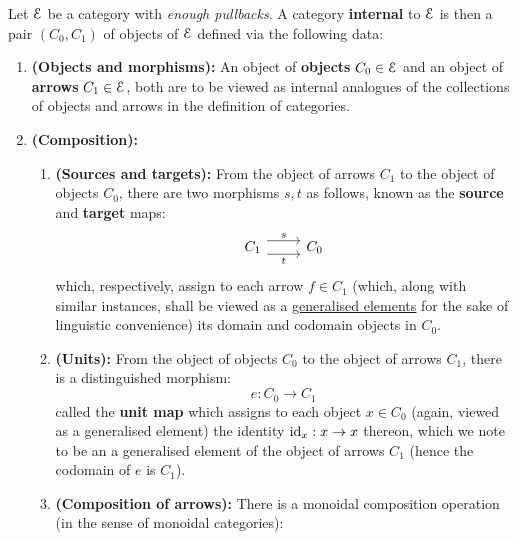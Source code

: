             \begin{definition} \label{def: internal_categories}
                Let $\mathcal{E}$ be a category with \textit{enough pullbacks}. A category \textbf{internal} to $\mathcal{E}$ is then a pair $(C_0, C_1)$ of objects of $\mathcal{E}$ defined via the following data:
                    \begin{enumerate}
                        \item \textbf{(Objects and morphisms):} An object of \textbf{objects} $C_0 \in \mathcal{E}$ and an object of \textbf{arrows} $C_1 \in \mathcal{E}$, both are to be viewed as internal analogues of the collections of objects and arrows in the definition of categories.
                        \item \textbf{(Composition):} 
                            \begin{enumerate}
                                \item \textbf{(Sources and targets):} From the object of arrows $C_1$ to the object of objects $C_0$, there are two morphisms $s, t$ as follows, known as the \textbf{source} and \textbf{target} maps:
                                    $$
                                        \begin{tikzcd}
                                        	{C_1} & {C_0}
                                        	\arrow["s", shift left=2, from=1-1, to=1-2]
                                        	\arrow["t"', shift right=2, from=1-1, to=1-2]
                                        \end{tikzcd}
                                    $$
                                which, respectively, assign to each arrow $f \in C_1$ (which, along with similar instances, shall be viewed as a \href{https://ncatlab.org/nlab/show/generalized+element}{\underline{generalised elements}} for the sake of linguistic convenience) its domain and codomain objects in $C_0$.
                                \item \textbf{(Units):} From the object of objects $C_0$ to the object of arrows $C_1$, there is a distinguished morphism:
                                    $$e: C_0 \to C_1$$
                                called the \textbf{unit map} which assigns to each object $x \in C_0$ (again, viewed as a generalised element) the identity $\mathrm{id}_x: x \to x$ thereon, which we note to be an a generalised element of the object of arrows $C_1$ (hence the codomain of $e$ is $C_1$).
                                \item \textbf{(Composition of arrows):} There is a monoidal composition operation (in the sense of monoidal categories):

\end{enumerate}
\end{enumerate}
\end{definition}
